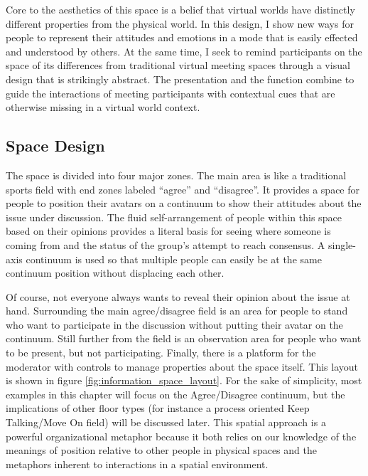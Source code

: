 Core to the aesthetics of this space is a belief that virtual worlds have distinctly different properties from the physical world. In this design, I show new ways for people to represent their attitudes and emotions in a mode that is easily effected and understood by others. At the same time, I seek to remind participants on the space of its differences from traditional virtual meeting spaces through a visual design that is strikingly abstract. The presentation and the function combine to guide the interactions of meeting participants with contextual cues that are otherwise missing in a virtual world context.


\subsection{Space Design}

The space is divided into four major zones. The main area is like a traditional sports field with end zones labeled ``agree'' and ``disagree''. It provides a space for people to position their avatars on a continuum to show their attitudes about the issue under discussion. The fluid self-arrangement of people within this space based on their opinions provides a literal basis for seeing where someone is coming from and the status of the group's attempt to reach consensus. A single-axis continuum is used so that multiple people can easily be at the same continuum position without displacing each other.

Of course, not everyone always wants to reveal their opinion about the issue at hand. Surrounding the main agree/disagree field is an area for people to stand who want to participate in the discussion without putting their avatar on the continuum. Still further from the field is an observation area for people who want to be present, but not participating. Finally, there is a platform for the moderator with controls to manage properties about the space itself. This layout is shown in figure \ref{fig:information_space_layout}. For the sake of simplicity, most examples in this chapter will focus on the Agree/Disagree continuum, but the implications of other floor types (for instance a process oriented Keep Talking/Move On field) will be discussed later. This spatial approach is a powerful organizational metaphor because it both relies on our knowledge of the meanings of position relative to other people in physical spaces \citep{Yee:2007cl} and the metaphors inherent to interactions in a spatial environment. \citep{lakoff_metaphors_1980}


